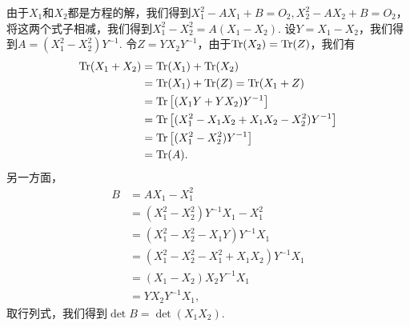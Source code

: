 \begin{solution}
  由于$X_1$和$X_2$都是方程的解，我们得到$X_1^2-AX_1+B=O_2,X_2^2-AX_2+B=O_2$，将这两个式子相减，我们得到$X_1^2-X_2^2=A(X_1-X_2)$. 设$Y=X_1-X_2$，我们得到$A=(X_1^2-X_2^2)Y^{-1}$. 令$Z=YX_2Y^{-1}$，由于$\operatorname{Tr}(X_2)=\operatorname{Tr}(Z)$，我们有
  \begin{align*}
    \operatorname{Tr}(X_1 + X_2) & = \operatorname{Tr}(X_1) + \operatorname{Tr}(X_2) \\
    & = \operatorname{Tr}(X_1) + \operatorname{Tr}(Z) = \operatorname{Tr}(X_1 + Z) \\
    & = \operatorname{Tr}\big[ (X_1Y + YX_2)Y^{-1} \big] \\
    & = \operatorname{Tr}\big[ (X_1^2 - X_1X_2 + X_1X_2 - X_2^2)Y^{-1} \big] \\
    & = \operatorname{Tr}\big[ (X_1^2 - X_2^2)Y^{-1} \big] \\
    & = \operatorname{Tr}(A).
  \end{align*}
  另一方面，
  \begin{align*}
    B & = AX_1 - X_1^2 \\
    & = (X_1^2 - X_2^2)Y^{-1}X_1 - X_1^2 \\
    & = (X_1^2 - X_2^2 - X_1Y)Y^{-1}X_1 \\
    & = (X_1^2 - X_2^2 - X_1^2 + X_1X_2)Y^{-1}X_1 \\
    & = (X_1 - X_2)X_2Y^{-1}X_1 \\
    & = YX_2Y^{-1}X_1,
  \end{align*}
  取行列式，我们得到$\det B=\det(X_1X_2)$.
\end{solution}

